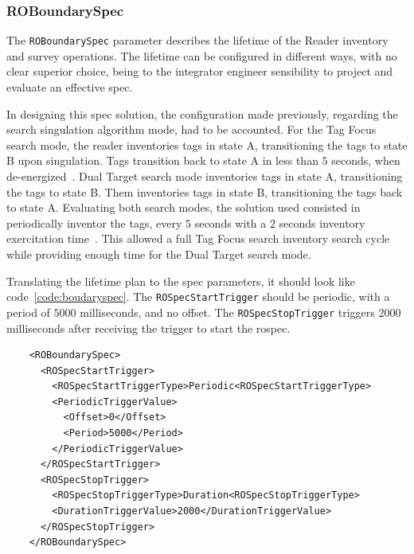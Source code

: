 \subsubsection{ROBoundarySpec}

The \texttt{ROBoundarySpec} parameter describes the lifetime of the Reader inventory and survey operations.
The lifetime can be configured in different ways, with no clear superior choice, being to the integrator engineer sensibility to project and evaluate an effective \ac{spec}.

In designing this \ac{spec} solution, the configuration made previously, regarding the search singulation algorithm mode, had to be accounted.
For the Tag Focus search mode, the reader inventories tags in state A, transitioning the tags to state B upon singulation. Tags transition back to state A in less than $5$ seconds, when de-energized~\cite{ImpinjOctaneLLRP}.
Dual Target search mode inventories tags in state A, transitioning the tags to state B. Them inventories tags in state B, transitioning the tags back to state A.
Evaluating both search modes, the solution used consisted in periodically inventor the tags, every $5$ seconds with a $2$ seconds inventory exercitation time~\cite{ImpinjOctaneLLRP, UnderstandingEPCGen2}.
This allowed a full Tag Focus search inventory search cycle while providing enough time for the Dual Target search mode.

Translating the lifetime plan to the \ac{spec} parameters, it should look like code~\ref{code:boudaryspec}. The \texttt{ROSpecStartTrigger} should be periodic, with a period of $5000$ milliseconds, and no offset. The \texttt{ROSpecStopTrigger} triggers $2000$ milliseconds after receiving the trigger to start the \ac{rospec}. 

\begin{listing}
    \begin{verbatim}
    <ROBoundarySpec>
      <ROSpecStartTrigger>
        <ROSpecStartTriggerType>Periodic<ROSpecStartTriggerType>
        <PeriodicTriggerValue>
          <Offset>0</Offset>
          <Period>5000</Period>
        </PeriodicTriggerValue>
      </ROSpecStartTrigger>
      <ROSpecStopTrigger>
        <ROSpecStopTriggerType>Duration<ROSpecStopTriggerType>
        <DurationTriggerValue>2000</DurationTriggerValue>
      </ROSpecStopTrigger>
    </ROBoundarySpec>
    \end{verbatim}
    \caption{}
    \label{code:boudaryspec}
\end{listing}

